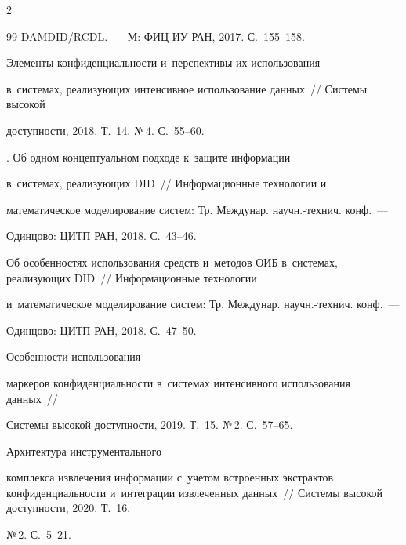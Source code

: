 \begin{multicols}{2}
{{\begin{thebibliography}{99}
DAMDID/RCDL.~--- М: ФИЦ ИУ РАН, 2017. С.~155--158.


  







 Элементы конфиденциальности и~перспективы их использования  


в~сис\-те\-мах, реализующих интенсивное использование данных~// Сис\-те\-мы высокой 


до\-ступ\-ности, 2018. Т.~14. №\,4. С.~55--60.




. Об одном концептуальном подходе к~защите информации 


в~сис\-те\-мах, реализующих DID~// Информационные технологии и~


математическое моделирование сис\-тем: Тр. Междунар. на\-учн.-тех\-нич. конф.~--- 


Одинцово: ЦИТП РАН, 2018. С.~43--46.




 Об особенностях использования средств и~методов ОИБ в~сис\-те\-мах, реализующих DID~// Информационные технологии 


и~математическое моделирование сис\-тем: Тр. Междунар. на\-учн.-тех\-нич. конф.~--- 


Одинцово: ЦИТП РАН, 2018. С.~47--50.







 Особенности использования 


маркеров конфиден\-ци\-аль\-ности в~системах интенсивного использования данных~// 


Сис\-те\-мы высокой до\-ступ\-ности, 2019. Т.~15. №\,2. С.~57--65.




 Архитектура инструментального 


комплекса извлечения информации с~учетом встроенных экстрактов конфиденциальности и~интеграции извлеченных данных~// Сис\-те\-мы высокой до\-ступ\-ности, 2020. Т.~16. 


№\,2. С.~5--21.






\end{thebibliography}}}
\end{multicols}
